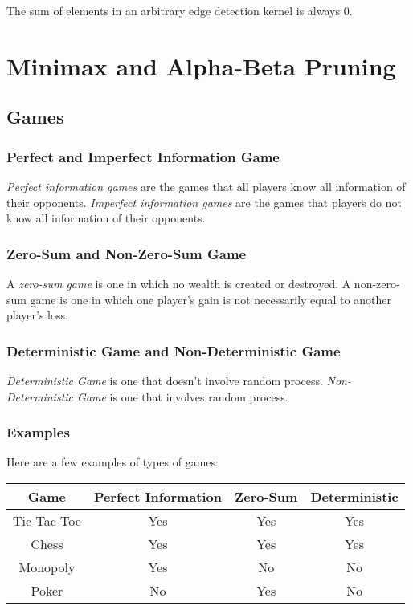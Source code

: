 \documentclass{note}
\begin{document}
\begin{note}
    The sum of elements in an arbitrary edge detection kernel is always $0$.
\end{note}

\chapter{Minimax and Alpha-Beta Pruning}

\section{Games}

\subsection{Perfect and Imperfect Information Game}

\textit{Perfect information games} are the games that all players know all information of their opponents. \textit{Imperfect information games} are the games that players do not know all information of their opponents.

\subsection{Zero-Sum and Non-Zero-Sum Game}

A \textit{zero-sum game} is one in which no wealth is created or destroyed. A non-zero-sum game is one in which one player's gain is not necessarily equal to another player's loss.

\subsection{Deterministic Game and Non-Deterministic Game}

\textit{Deterministic Game} is one that doesn't involve random process. \textit{Non-Deterministic Game} is one that involves random process.

\subsection{Examples}

Here are a few examples of types of games:

\begin{center}
    \begin{tabular}{c|ccc}
        Game & Perfect Information & Zero-Sum & Deterministic \\
        \hline
        Tic-Tac-Toe & Yes & Yes & Yes \\
        Chess & Yes & Yes & Yes \\
        Monopoly & Yes & No & No \\
        Poker & No & Yes & No \\
    \end{tabular}
\end{center}
\end{document}
